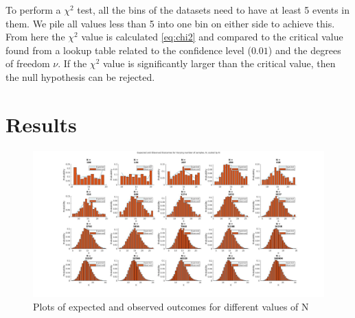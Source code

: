 \documentclass[a4paper, 12pt]{article}
\begin{document}
        To perform a $\chi^2$ test, all the bins of the datasets need to have at least 5 events in them. We pile all values less than 5 into one bin on either side to achieve this. From here the $\chi^2$ value is calculated \cref{eq:chi2} and compared to the critical value found from a lookup table related to the confidence level ($0.01$) and the degrees of freedom $\nu$. If the $\chi^2$ value is significantly larger than the critical value, then the null hypothesis can be rejected.


        \section{Results}
            \begin{figure}[!h]
                \centering
                \includegraphics[width=\textwidth]{observerdVsExpected.jpg}
                \caption{Plots of expected and observed outcomes for different values of N}
                \label{fig:plot}
            \end{figure}
\end{document}
